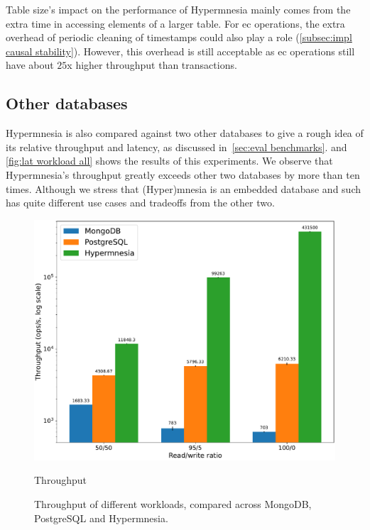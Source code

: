 Table size's impact on the performance of Hypermnesia mainly comes from the
extra time in accessing elements of a larger table. For \acrshort{ec} operations,
the extra overhead of periodic cleaning of timestamps could also play a 
role (\cref{subsec:impl causal stability}). However, this overhead 
is still acceptable as \acrshort{ec}
operations still have about \(25\)x higher throughput than transactions.

\subsection{Other databases} \label{subsec:eval other db}

Hypermnesia is also compared against two other databases to give a rough idea of its
relative throughput and latency, as discussed in~\cref{sec:eval benchmarks}. 
 and \cref{fig:lat workload all}
shows the results of this experiments. We observe that Hypermnesia's throughput greatly
exceeds other two databases by more than ten times. Although we stress that (Hyper)mnesia
is an embedded database and such has quite different use cases and tradeoffs from the
other two.

\begin{figure}[htp]
    \centering
    \includegraphics[width=0.96\columnwidth]{figures/tp_workload_all.pdf}
    \caption{Throughput}
  \caption{Throughput of different workloads, compared across MongoDB,
  PostgreSQL and Hypermnesia.}
  \label{fig:tp workload all}
\end{figure}


